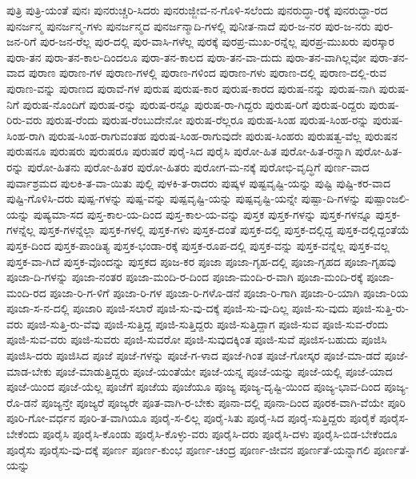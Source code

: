 {ಪುತ್ರಿ
ಪುತ್ರಿ-ಯಂತೆ
ಪುನಃ
ಪುನರುಚ್ಚರಿ-ಸಿದರು
ಪುನರುಜ್ಜೀವ-ನ-ಗೊಳಿ-ಸಲೆಂದು
ಪುನರುದ್ಧಾ-ರಕ್ಕೆ
ಪುನರುದ್ಧಾ-ರದ
ಪುನರ್ಜನ್ಮ
ಪುನರ್ಜನ್ಮ-ಗಳು
ಪುನರ್ಜನ್ಮದ
ಪುನರ್ಜನ್ಮಾದಿ-ಗಳಲ್ಲಿ
ಪುನೀತ-ನಾದೆ
ಪುರ-ಜ-ನರ
ಪುರ-ಜ-ನರು
ಪುರ-ಜನ-ರಿಗೆ
ಪುರ-ಜನ-ರೆಲ್ಲ
ಪುರ-ದಲ್ಲಿ
ಪುರ-ವಾಸಿ-ಗಳೆಲ್ಲ
ಪುರಕ್ಕೆ
ಪುರಪ್ರ-ಮುಖ-ರನ್ನೆಲ್ಲ
ಪುರಪ್ರ-ಮುಖರು
ಪುರಸ್ಕಾರ
ಪುರಾ-ತನ
ಪುರಾ-ತನ-ಕಾಲ-ದಿಂದಲೂ
ಪುರಾ-ತನ-ಕಾಲದ
ಪುರಾ-ತನ-ವಾ-ದುದು
ಪುರಾ-ತನ-ವಾಗಿಲ್ಲವೋ
ಪುರಾ-ತನ-ವಾದ
ಪುರಾಣ
ಪುರಾಣ-ಗಳ
ಪುರಾಣ-ಗಳಲ್ಲಿ
ಪುರಾಣ-ಗಳಿಂದ
ಪುರಾಣ-ಗಳು
ಪುರಾಣ-ದಲ್ಲಿ
ಪುರಾಣ-ದಲ್ಲಿ-ರುವ
ಪುರಾಣ-ವನ್ನು
ಪುರಾಣದ
ಪುರಾವೆ-ಗಳ
ಪುರುಷ
ಪುರುಷ-ಕಾರ
ಪುರುಷ-ಕಾರದ
ಪುರುಷ-ನನ್ನು
ಪುರುಷ-ನಾಗಿ
ಪುರುಷ-ನಿಗೆ
ಪುರುಷ-ನೊಂದಿಗೆ
ಪುರುಷ-ರನ್ನು
ಪುರುಷ-ರನ್ನೂ
ಪುರುಷ-ರಾ-ಗಿದ್ದರು
ಪುರುಷ-ರಿಗೆ
ಪುರುಷ-ರಿದ್ದರು
ಪುರುಷ-ರಿರು-ವರು
ಪುರುಷ-ರೆಂದು
ಪುರುಷ-ರೆಂಬುದೇನೋ
ಪುರುಷ-ರೆಲ್ಲರೂ
ಪುರುಷ-ಸಿಂಹ
ಪುರುಷ-ಸಿಂಹ-ರನ್ನು
ಪುರುಷ-ಸಿಂಹ-ರಾಗಿ
ಪುರುಷ-ಸಿಂಹ-ರಾಗುವಂತಹ
ಪುರುಷ-ಸಿಂಹ-ರಾಗುವುದೇ
ಪುರುಷ-ಸಿಂಹರು
ಪುರುಷತ್ವ-ವೆಲ್ಲ
ಪುರುಷನ
ಪುರುಷನೂ
ಪುರುಷರು
ಪುರುಷರೂ
ಪುರುಷರೆ
ಪುರೈ-ಸಿದ
ಪುರೈಸಿ
ಪುರೋ-ಹಿತ
ಪುರೋ-ಹಿತ-ರನ್ನಾಗಿ
ಪುರೋ-ಹಿತ-ರನ್ನು
ಪುರೋ-ಹಿತನು
ಪುರೋ-ಹಿತರ
ಪುರೋ-ಹಿತರು
ಪುರೋಗ-ಮ-ನಕ್ಕೆ
ಪುರೋಭಿ-ವೃದ್ಧಿಗೆ
ಪುರ್ಣ-ವಾದ
ಪುರ್ವಾಶ್ರಮದ
ಪುಲಕಿ-ತ-ವಾ-ಯಿತು
ಪುಲ್ಲಿ
ಪುಳಕಿ-ತ-ರಾದರು
ಪುಷ್ಕಳ
ಪುಷ್ಟವೃಷ್ಟಿ-ಯನ್ನು
ಪುಷ್ಟಿ
ಪುಷ್ಟಿ-ಕರ-ವಾದ
ಪುಷ್ಟಿ-ಗೊಳಿಸಿ-ದರು
ಪುಷ್ಪ-ಗಳನ್ನು
ಪುಷ್ಪ-ವನ್ನು
ಪುಷ್ಪವೃಷ್ಟಿ-ಯನ್ನು
ಪುಷ್ಪವೃಷ್ಟಿ-ಯನ್ನೇ
ಪುಷ್ಪಾ-ದಿ-ಗಳನ್ನು
ಪುಷ್ಪಾಂಜಲಿ-ಯನ್ನು
ಪುಷ್ಯಮಾ-ಸದ
ಪುಸ್ತ-ಕಾಲ-ಯ-ದಿಂದ
ಪುಸ್ತ-ಕಾಲ-ಯ-ವನ್ನು
ಪುಸ್ತಕ
ಪುಸ್ತಕ-ಗಳನ್ನು
ಪುಸ್ತಕ-ಗಳನ್ನೂ
ಪುಸ್ತಕ-ಗಳನ್ನೆಲ್ಲ
ಪುಸ್ತಕ-ಗಳನ್ನೆಲ್ಲಾ
ಪುಸ್ತಕ-ಗಳಲ್ಲಿ
ಪುಸ್ತಕ-ಗಳು
ಪುಸ್ತಕ-ದಂತೆ
ಪುಸ್ತಕ-ದಲ್ಲಿ
ಪುಸ್ತಕ-ದಲ್ಲಿದ್ದ
ಪುಸ್ತಕ-ದಲ್ಲಿದ್ದಂತೆಯೆ
ಪುಸ್ತಕ-ದಿಂದ
ಪುಸ್ತಕ-ಪಾಂಡಿತ್ಯ
ಪುಸ್ತಕ-ಭಂಡಾ-ರಕ್ಕೆ
ಪುಸ್ತಕ-ರೂಪ-ದಲ್ಲಿ
ಪುಸ್ತಕ-ವನ್ನು
ಪುಸ್ತಕ-ವನ್ನೆಲ್ಲ
ಪುಸ್ತಕ-ವಲ್ಲ
ಪುಸ್ತಕ-ವಾ-ಗಿದೆ
ಪುಸ್ತಕ-ವೊಂದನ್ನು
ಪುಸ್ತಕದ
ಪೂಜ-ಕರ
ಪೂಜಾ
ಪೂಜಾ-ಗೃಹ-ದಲ್ಲಿ
ಪೂಜಾ-ಗೃಹದ
ಪೂಜಾ-ಗೃಹವು
ಪೂಜಾ-ದಿ-ಗಳನ್ನು
ಪೂಜಾ-ನಂತರ
ಪೂಜಾ-ಮಂದಿ-ರ-ದಿಂದ
ಪೂಜಾ-ಮಂದಿ-ರ-ವಾಗಿ
ಪೂಜಾ-ಮಂದಿ-ರಕ್ಕೆ
ಪೂಜಾ-ಮಂದಿ-ರದ
ಪೂಜಾ-ರಿ-ಗ-ಳಿಗೆ
ಪೂಜಾ-ರಿ-ಗಳ
ಪೂಜಾ-ರಿ-ಗಳೊ-ಡನೆ
ಪೂಜಾ-ರಿ-ಗಾಗಿ
ಪೂಜಾ-ರಿ-ಯಾಗಿ
ಪೂಜಾ-ರಿಯ
ಪೂಜಾ-ಸ-ನ-ದಲ್ಲಿ
ಪೂಜಾರಿ
ಪೂಜಿ-ಸಲಾರೆ
ಪೂಜಿ-ಸು-ವು-ದಕ್ಕೆ
ಪೂಜಿ-ಸು-ವು-ದಿಲ್ಲ
ಪೂಜಿ-ಸು-ವುದು
ಪೂಜಿ-ಸುತ್ತಿ-ರು-ವರು
ಪೂಜಿ-ಸುತ್ತಿ-ರು-ವೆವು
ಪೂಜಿ-ಸುತ್ತಿದ್ದ
ಪೂಜಿ-ಸುತ್ತಿದ್ದರು
ಪೂಜಿ-ಸುತ್ತಿದ್ದಾಗ
ಪೂಜಿ-ಸುವ
ಪೂಜಿ-ಸುವ-ರೆಂದು
ಪೂಜಿ-ಸುವ-ವರು
ಪೂಜಿ-ಸುವರು
ಪೂಜಿ-ಸುವರೋ
ಪೂಜಿ-ಸುವುದಕ್ಕಿಂತ
ಪೂಜಿ-ಸುವೆ
ಪೂಜಿಸ-ಬಹುದು
ಪೂಜಿಸಿ
ಪೂಜಿಸಿ-ದರು
ಪೂಜಿಸಿದ
ಪೂಜೆ
ಪೂಜೆ-ಗಳನ್ನು
ಪೂಜೆ-ಗ-ಳಾದ
ಪೂಜೆ-ಗಿಂತ
ಪೂಜೆ-ಗೋಸ್ಕರ
ಪೂಜೆ-ಮಾ-ಡದೆ
ಪೂಜೆ-ಮಾಡ-ಬೇಕು
ಪೂಜೆ-ಮಾಡುತ್ತಿದ್ದರು
ಪೂಜೆ-ಯಂತೆಯೇ
ಪೂಜೆ-ಯನ್ನ
ಪೂಜೆ-ಯನ್ನು
ಪೂಜೆ-ಯಲ್ಲಿ
ಪೂಜೆ-ಯಾದ
ಪೂಜೆ-ಯಿಂದ
ಪೂಜೆ-ಯೆಲ್ಲ
ಪೂಜೆಗೆ
ಪೂಜೆಯ
ಪೂಜೆಯೂ
ಪೂಜ್ಯ
ಪೂಜ್ಯ-ದೃಷ್ಟಿ-ಯಿಂದ
ಪೂಜ್ಯ-ಭಾವ-ದಿಂದ
ಪೂಜ್ಯ-ರೊ-ಡನೆ
ಪೂಜ್ಯನ್ತೇ
ಪೂಜ್ಯರೆ
ಪೂಜ್ಯರೇ
ಪೂತ-ವಾಗಿ-ರ-ಬೇಕು
ಪೂನಾ-ದಲ್ಲಿ
ಪೂನಾ-ದಿಂದ
ಪೂರಕ-ವಾಗಿ-ವೆಯೇ
ಪೂರಿ
ಪೂರಿ-ಗೋ-ವರ್ಧನ
ಪೂರಿ-ತ-ವಾಗಿಯೂ
ಪೂರೈ-ಸ-ಲಿಲ್ಲ
ಪೂರೈ-ಸಿತು
ಪೂರೈ-ಸಿದ
ಪೂರೈ-ಸುತ್ತಿದ್ದರು
ಪೂರೈಕೆ
ಪೂರೈಸ-ಬೇಕೆಂದು
ಪೂರೈಸಿ
ಪೂರೈಸಿ-ಕೊಂಡು
ಪೂರೈಸಿ-ಕೊಳ್ಳು-ವರು
ಪೂರೈಸಿ-ದರು
ಪೂರೈಸಿ-ದಳು
ಪೂರೈಸಿ-ಬಿಡ-ಬೇಕೆಂದೂ
ಪೂರೈಸು
ಪೂರೈಸು-ವು-ದಕ್ಕೆ
ಪೂರ್ಣ
ಪೂರ್ಣ-ಕುಂಭ
ಪೂರ್ಣ-ಚಂದ್ರ
ಪೂರ್ಣ-ಜೀವನ
ಪೂರ್ಣತೆ-ಯನ್ನಾಗಲಿ
ಪೂರ್ಣತೆ-ಯನ್ನು
}
